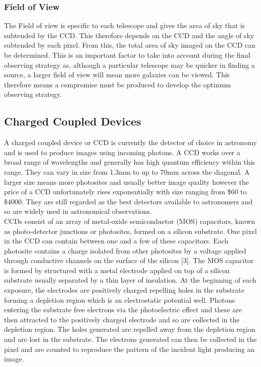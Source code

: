 \documentclass[pdf,color]{UoBnote}
\begin{document}
\subsubsection{Field of View}
The Field of view is specific to each telescope and gives the area of sky that is subtended by the CCD. This therefore depends on the CCD and the angle of sky subtended by each pixel. From this, the total area of sky imaged on the CCD can be determined. This is an important factor to take into account during the final observing strategy as, although a particular telescope may be quicker in finding a source, a larger field of view will mean more galaxies can be viewed. This therefore means a compromise must be produced to develop the optimum observing strategy.\\

\subsection{Charged Coupled Devices}
A charged coupled device or CCD is currently the detector of choice in astronomy and is used to produce images using incoming photons. A CCD works over a broad range of wavelengths and generally has high quantum efficiency within this range. They can vary in size from 1.3mm to up to 70mm across the diagonal. A larger size means more photosites and usually better image quality however the price of a CCD unfortunately rises exponentially with size ranging from \$60 to \$4000. They are still regarded as the best detectors available to astronomers and so are widely used in astronomical observations.\\
\newline
CCDs consist of an array of metal-oxide semiconductor (MOS) capacitors, known as photo-detector junctions or photosites, formed on a silicon substrate. One pixel in the CCD can contain between one and a few of these capacitors. Each photosite contains a charge isolated from other photosites by a voltage applied through conductive channels on the surface of the silicon [3]. The MOS capacitor is formed by structured with a metal electrode applied on top of a silicon substrate usually separated by a thin layer of insulation. At the beginning of each exposure, the electrodes are positively charged repelling holes in the substrate forming a depletion region which is an electrostatic potential well. Photons entering the substrate free electrons via the photoelectric effect and these are then attracted to the positively charged electrode and so are collected in the depletion region. The holes generated are repelled away from the depletion region and are lost in the substrate. The electrons generated can then be collected in the pixel and are counted to reproduce the pattern of the incident light producing an image.\\
\end{document}
